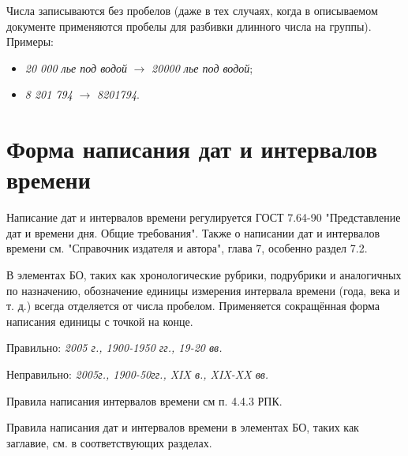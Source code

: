 Числа записываются без пробелов (даже в тех случаях, когда в описываемом документе применяются пробелы для разбивки длинного числа на группы). Примеры:

\begin{itemize}
	\item \textit{20 000 лье под водой} $\rightarrow$ \textit{20000 лье под водой};
	\item \textit{8 201 794} $\rightarrow$ \textit{8201794}.
\end{itemize}

\section*{Форма написания дат и интервалов времени}

Написание дат и интервалов времени регулируется ГОСТ 7.64-90 "Представление дат и времени дня. Общие требования". Также о написании дат и интервалов времени см. "Справочник издателя и автора", глава 7, особенно раздел 7.2.

В элементах БО, таких как хронологические рубрики, подрубрики и аналогичных по назначению, обозначение единицы измерения интервала времени (года, века и т. д.) всегда отделяется от числа пробелом. Применяется сокращённая форма написания единицы с точкой на конце.

Правильно: \textit{2005 г., 1900-1950 гг., 19-20 вв.}

Неправильно: \textit{2005г., 1900-50гг., XIX в., XIX-XX вв.}

Правила написания интервалов времени см п. 4.4.3 РПК.

Правила написания дат и интервалов времени в элементах БО, таких как заглавие, см. в соответствующих разделах.
